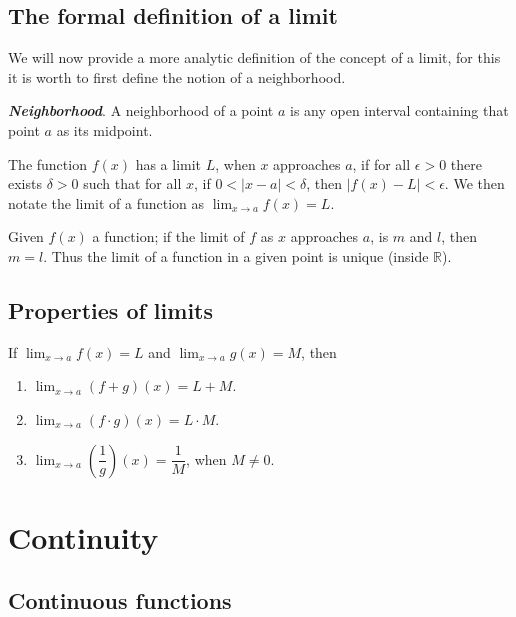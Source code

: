 \documentclass{report}
\begin{document}
\section{The formal definition of a limit}

We will now provide a more analytic definition of the concept of a limit, for this it is worth to first define the notion of a neighborhood.

\begin{defBox}
    \textit{\textbf{Neighborhood}}. A neighborhood of a point $a$ is any open interval containing that point $a$ as its midpoint.
\end{defBox}

\begin{defBox}
    The function $f(x)$ has a limit $L$, when $x$ approaches $a$, if for all $\epsilon > 0$ there exists $\delta > 0$ such that for all $x$, if $0 < |x-a| <\delta$, then $|f(x)-L| < \epsilon$. We then notate the limit of a function as $\lim_{x \to a} f(x) = L$.
\end{defBox}

\begin{thBox}
    Given $f(x)$ a function; if the limit of $f$ as $x$ approaches $a$, is $m$ and $l$, then $m=l$. Thus the limit of a function in a given point is unique (inside $\mathbb{R}$).
\end{thBox}

\section{Properties of limits}

\begin{thBox}
    If $\lim_{x \to a} f(x) = L$ and $\lim_{x \to a} g(x) = M$, then

    \begin{enumerate}
        \item $\lim_{x \to a} (f + g)(x) = L + M$.
        \item $\lim_{x \to a} (f \cdot g)(x) = L \cdot M$.
        \item $\lim_{x \to a} (\dfrac{1}{g})(x) = \dfrac{1}{M}$, when $M \not = 0$.
    \end{enumerate}
\end{thBox}

\chapter{Continuity}

\section{Continuous functions}
\end{document}
